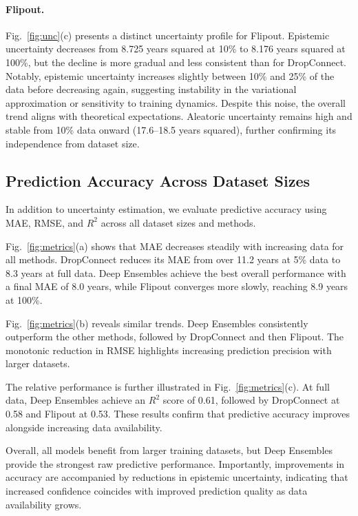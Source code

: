 \documentclass[runningheads]{llncs}
\begin{document}
\paragraph{Flipout.}
Fig.~\ref{fig:unc}(c) presents a distinct uncertainty profile for Flipout. Epistemic uncertainty decreases from 8.725 years squared at 10\% to 8.176 years squared at 100\%, but the decline is more gradual and less consistent than for DropConnect. Notably, epistemic uncertainty increases slightly between 10\% and 25\% of the data before decreasing again, suggesting instability in the variational approximation or sensitivity to training dynamics. Despite this noise, the overall trend aligns with theoretical expectations. Aleatoric uncertainty remains high and stable from 10\% data onward (17.6--18.5 years squared), further confirming its independence from dataset size.

\subsection{Prediction Accuracy Across Dataset Sizes}

In addition to uncertainty estimation, we evaluate predictive accuracy using MAE, RMSE, and $R^2$ across all dataset sizes and methods.

Fig.~\ref{fig:metrics}(a) shows that MAE decreases steadily with increasing data for all methods. DropConnect reduces its MAE from over 11.2 years at 5\% data to 8.3 years at full data. Deep Ensembles achieve the best overall performance with a final MAE of 8.0 years, while Flipout converges more slowly, reaching 8.9 years at 100\%.

Fig.~\ref{fig:metrics}(b) reveals similar trends. Deep Ensembles consistently outperform the other methods, followed by DropConnect and then Flipout. The monotonic reduction in RMSE highlights increasing prediction precision with larger datasets.

The relative performance is further illustrated in Fig.~\ref{fig:metrics}(c). At full data, Deep Ensembles achieve an $R^2$ score of 0.61, followed by DropConnect at 0.58 and Flipout at 0.53. These results confirm that predictive accuracy improves alongside increasing data availability.

Overall, all models benefit from larger training datasets, but Deep Ensembles provide the strongest raw predictive performance. Importantly, improvements in accuracy are accompanied by reductions in epistemic uncertainty, indicating that increased confidence coincides with improved prediction quality as data availability grows.
\end{document}
